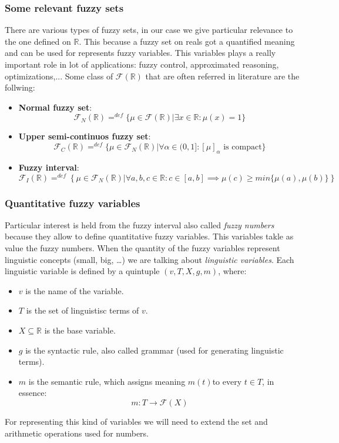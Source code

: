 \documentclass{article}
\begin{document}
\subsubsection{Some relevant fuzzy sets}
There are various types of fuzzy sets, in our case we give particular relevance to the one
defined on $\mathbb{R}$. This because a fuzzy set on reals got a quantified meaning and can be
used for represents fuzzy variables. This variables plays a really important role in lot of
applications: fuzzy control, approximated reasoning, optimizations,...
Some class of $\mathcal{F}(\mathbb{R})$ that are often referred in literature are the follwing:
\begin{itemize}
    \item \textbf{Normal fuzzy set}:
          $$\mathcal{F}_N(\mathbb{R})=^{def} \{\mu\in\mathcal{F}(\mathbb{R})|\exists x\in\mathbb{R}:\mu(x)=1 \}$$
    \item \textbf{Upper semi-continuos fuzzy set}:
          $$\mathcal{F}_C(\mathbb{R})=^{def} \{\mu\in\mathcal{F}_N(\mathbb{R})| \forall\alpha\in (0,1]:[\mu]_\alpha \text{ is compact}\}$$
    \item \textbf{Fuzzy interval}:
          $$\mathcal{F}_I(\mathbb{R})=^{def}\left\{\mu\in\mathcal{F}_N(\mathbb{R})|\forall a,b,c \in\mathbb{R}:c\in [a,b]\implies \mu(c)\geq min\{\mu(a),\mu(b)\}\right\}$$

\end{itemize}

\subsubsection{Quantitative fuzzy variables}
Particular interest is held from the fuzzy interval also called \textit{fuzzy numbers} because they allow
to define quantitative fuzzy variables. This variables takle as value the fuzzy numbers. When the
quantity of the fuzzy variables represent linguistic concepts (small, big, \dots) we are talking
about \textit{linguistic variables}. Each linguistic variable is defined by a quintuple $(v, T,X,g,m)$,
where:
\begin{itemize}
    \item $v$ is the name of the variable.
    \item $T$ is the set of linguistisc terms of $v$.
    \item $X\subseteq\mathbb{R}$ is the base variable.
    \item $g$ is the syntactic rule, also called grammar (used for generating linguistic terms).
    \item $m$ is the semantic rule, which assigns meaning $m(t)$to every $t\in T$, in essence:
          $$m:T\rightarrow\mathcal{F}(X)$$
\end{itemize}
For representing this kind of variables we will need to extend the set and arithmetic operations
used for numbers.
\end{document}
